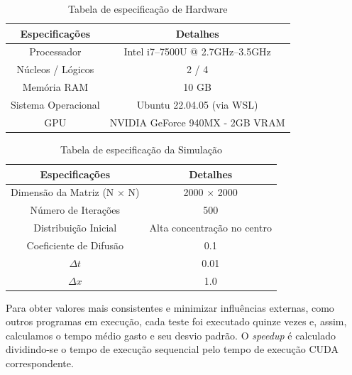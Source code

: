 \documentclass[12pt]{article}
\begin{document}
\begin{table}[ht]
  \centering
  \caption{Tabela de especificação de Hardware}
  \vspace{0.3cm}
  \begin{tabular}{||c c||}
    \hline
    Especificações      & Detalhes                         \\ [0.5ex]
    \hline\hline
    Processador         & Intel i7--7500U @ 2.7GHz--3.5GHz \\
    \hline
    Núcleos / Lógicos   & 2 / 4                            \\
    \hline
    Memória RAM         & 10 GB                            \\
    \hline
    Sistema Operacional & Ubuntu 22.04.05 (via WSL)        \\
    \hline
    GPU                 & NVIDIA GeForce 940MX - 2GB VRAM  \\
    \hline
  \end{tabular}\label{tab:especificacaoHardware}
\end{table}

\begin{table}[ht]
  \centering
  \caption{Tabela de especificação da Simulação}
  \vspace{0.3cm}
  \begin{tabular}{||c c||}
    \hline
    Especificações                    & Detalhes                    \\ [0.5ex]
    \hline\hline
    Dimensão da Matriz (N $\times$ N) & 2000 $\times$ 2000          \\
    \hline
    Número de Iterações               & 500                         \\
    \hline
    Distribuição Inicial              & Alta concentração no centro \\
    \hline
    Coeficiente de Difusão            & 0.1                         \\
    \hline
    $\Delta t$                        & 0.01                        \\
    \hline
    $\Delta x$                        & 1.0                         \\
    \hline
  \end{tabular}\label{tab:especificacaoSimulacao}
\end{table}

Para obter valores mais consistentes e minimizar influências externas, como
outros programas em execução, cada teste foi executado quinze vezes e, assim,
calculamos o tempo médio gasto e seu desvio padrão. O \textit{speedup} é
calculado dividindo-se o tempo de execução sequencial pelo tempo de execução
CUDA correspondente.
\end{document}

